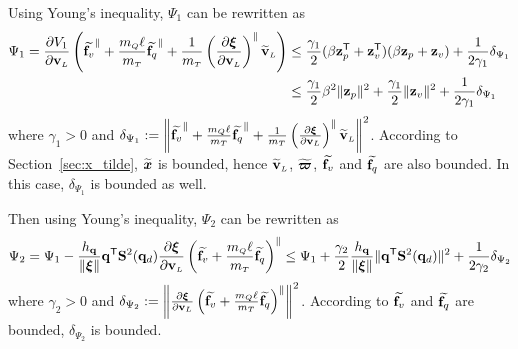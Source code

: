 \documentclass[journal,onecolumn]{IEEEtran}
\begin{document}
Using Young's inequality, $\Psi_1$ can be rewritten as
% 
\begin{equation}
	\begin{aligned}
	\Psi_1=\frac{\partial V_1}{\partial \vL}\LP\widetilde{\f_v}^{\|} + \frac{\mQ\ellp}{\mT}\widetilde{\f_q}^{\|} + \frac{1}{\mT}\LP\frac{\partial\Xiq}{\partial\vL}\RP^{\|}\vLtilde\RP&\leq \frac{\gamma_1}{2}(\beta\zp[T]+\zv[T])(\beta\zp+\zv) + \frac{1}{2\gamma_1}\delta_{\Psi_1}\\
	&\leq \frac{\gamma_1}{2} \beta^2\|\zp\|^2 +\frac{\gamma_1}{2}\|\zv\|^2 + \frac{1}{2\gamma_1}\delta_{\Psi_1}
    \end{aligned}
\end{equation}
%
where $\gamma_1>0$ and $\delta_{\Psi_1}:=\left\|\widetilde{\f_v}^{\|} + \frac{\mQ\ellp}{\mT}\widetilde{\f_q}^{\|} + \frac{1}{\mT}\LP\frac{\partial\Xiq}{\partial\vL}\RP^{\|}\vLtilde\right\|^2$. 
According to Section~\ref{sec:x_tilde}, $\widetilde{\boldsymbol{x}}$ is bounded, hence $\vLtilde$, $\widetilde{\boldsymbol{\varpi}}$, $\widetilde{\f_v}$ and $\widetilde{\f_q}$ are also bounded. 
In this case, $\delta_{\Psi_1}$ is bounded as well.

Then using Young's inequality, $\Psi_2$ can be rewritten as
%
\begin{equation}
	\begin{aligned}
		\Psi_2=\Psi_1 - \frac{h_\v{q}}{\|\Xiq\|}\dir[T]\Skew[2]{\dird}  \frac{\partial \Xiq}{\partial \vL}\LP\widetilde{\f_v} 
		+ \frac{\mQ\ellp}{\mT}\widetilde{\f_q} \RP^{\|}
		\leq \Psi_1 + \frac{\gamma_2}{2} \frac{h_\v{q}}{\|\Xiq\|} \|\dir[T]\Skew[2]{\dird}\|^2 + \frac{1}{2\gamma_2}\delta_{\Psi_2}
	\end{aligned}
\end{equation}
% 
where $\gamma_2>0$ and $\delta_{\Psi_2}:=\left\|\frac{\partial \Xiq}{\partial \vL}\LP\widetilde{\f_v} 
+ \frac{\mQ\ellp}{\mT}\widetilde{\f_q} \RP^{\|}\right\|^2$. 
According to $\widetilde{\f_v}$ and $\widetilde{\f_q}$ are bounded, $\delta_{\Psi_2}$ is bounded.
\end{document}
